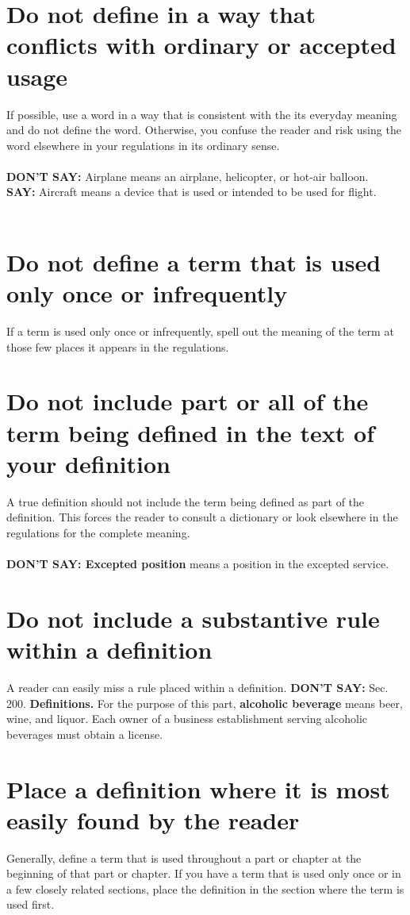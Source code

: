 \documentclass[12pt, letterpaper]{report}
\begin{document}
\begin{linenumbers}
\section{Do not define in a way that conflicts with ordinary or accepted usage}
If possible, use a word in a way that is consistent with the its everyday meaning and do not define the word. Otherwise, you confuse the reader and risk using the word elsewhere in your regulations in its ordinary sense.\\\\
\textbf{DON'T SAY:} Airplane means an airplane, helicopter, or hot-air balloon.\\
\textbf{SAY: }Aircraft means a device that is used or intended to be used for flight.\\\\
[Here the definition is broad enough to include any device that flies and at the same time the word is not used in a way that conflicts with its ordinary meaning.]
\section{Do not define a term that is used only once or infrequently} If a term is used only once or infrequently, spell out the meaning of the term at those few places it appears in the regulations.
\section{Do not include part or all of the term being defined in the text of your definition} 
A true definition should not include the term being defined as part of the definition. This forces the reader to consult a dictionary or look elsewhere in the regulations for the complete meaning.\\\\
\textbf{DON'T SAY: Excepted position} means a position in the excepted service.
\section{Do not include a substantive rule within a definition} 
A reader can easily miss a rule placed within a definition.
\textbf{DON'T SAY:} Sec. 200. \textbf{Definitions.} For the purpose of this part, \textbf{alcoholic beverage} means beer, wine, and liquor. Each owner of a business establishment serving alcoholic beverages must obtain a license.
\section{ Place a definition where it is most easily found by the reader} Generally, define a term that is used throughout a part or chapter at the beginning of that part or chapter. If you have a term that is used only once or in a few closely related sections, place the definition in the section where the term is used first.

\end{linenumbers}
\end{document}
